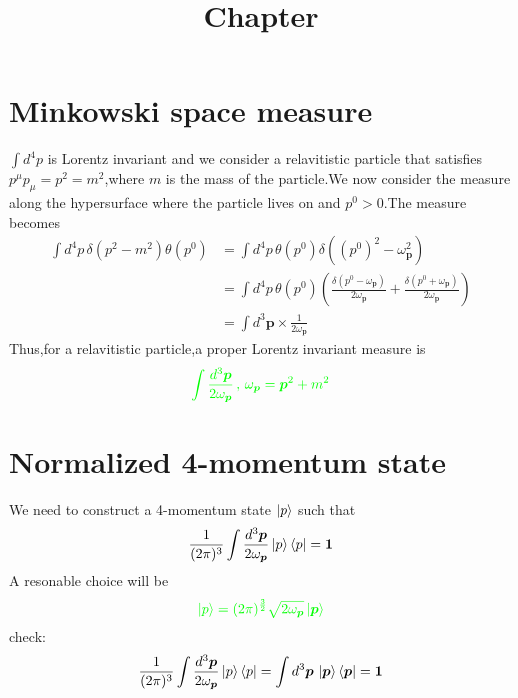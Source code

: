 \documentclass[a4paper]{article}
\begin{document}
	\title{Chapter}
	\date{ }
	\maketitle
	\section{Minkowski space measure}
	$\int d^4p$ is Lorentz invariant and we consider a relavitistic particle that satisfies $p^\mu p_\mu = p^2 = m^2$,where $m$ is the mass of the particle.We now consider the measure along the hypersurface where the particle lives on and $p^0>0$.The measure becomes
	\begin{align*}
		\int d^4p\,\delta(p^2-m^2)\theta(p^0)&=\int d^4p\,\theta(p^0)\delta((p^0)^2-\omega_{\bm{p}}^2)\\
		&=\int d^4p\,\theta(p^0)(\frac{\delta(p^0-\omega_{\bm{p}})}{2\omega_{\bm{p}}}+\frac{\delta(p^0+\omega_{\bm{p}})}{2\omega_{\bm{p}}})\\
		&=\int d^3\bm{p}\times\frac{1}{2\omega_{\bm{p}}}
	\end{align*}
	Thus,for a relavitistic particle,a proper Lorentz invariant measure is$$\textcolor{green}{\int\frac{d^3\bm{p}}{2\omega_{\bm{p}}}\, , \,\omega_{\bm{p}}=\bm{p}^2+m^2}$$
	\section{Normalized 4-momentum state}
	We need to construct a 4-momentum state $\ket{p}$ such that$$\frac{1}{(2\pi)^3}\int\frac{d^3\bm{p}}{2\omega_{\bm{p}}}\ket{p}\bra{p}=\bm{1}$$A resonable choice will be $$\textcolor{green}{\ket{p}=(2\pi)^{\frac{3}{2}}\sqrt{2\omega_{\bm{p}}}\ket{\bm{p}}}$$
	check:$$\frac{1}{(2\pi)^3}\int\frac{d^3\bm{p}}{2\omega_{\bm{p}}}\ket{p}\bra{p}=\int d^3\bm{p}\,\ket{\bm{p}}\bra{\bm{p}}=\bm{1}$$
\end{document}
